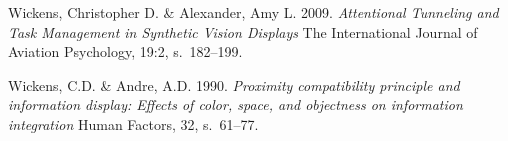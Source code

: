 \documentclass[utf8,bachelor,manualbib]{gradu3}
\begin{document}
\begin{thebibliography}{}
Wickens, Christopher D. \& Alexander, Amy L. 2009.
\textit{Attentional Tunneling and Task Management in Synthetic Vision Displays}
The International Journal of Aviation Psychology, 19:2, s.~182--199.

Wickens, C.D. \& Andre, A.D. 1990.
\textit{Proximity compatibility principle and information display: Effects
of color, space, and objectness on information integration}
Human Factors, 32, s.~61--77.

\end{thebibliography}
\end{document}
